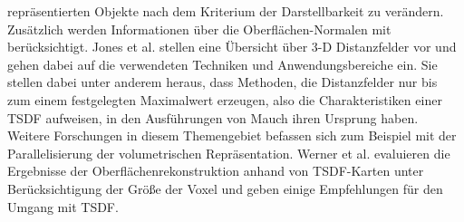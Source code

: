 repräsentierten Objekte nach dem Kriterium der Darstellbarkeit zu verändern. Zusätzlich werden Informationen über die Oberflächen-Normalen mit berücksichtigt.
Jones et al. \cite{jones2006distance} stellen eine Übersicht über 3-D Distanzfelder vor und gehen dabei auf die verwendeten Techniken und Anwendungsbereiche ein. Sie stellen dabei unter anderem heraus, dass Methoden, die Distanzfelder nur bis zum einem festgelegten Maximalwert erzeugen, also die Charakteristiken einer TSDF aufweisen, in den Ausführungen von Mauch \cite{mauch200fast, mauch2003efficient} ihren Ursprung haben. Weitere Forschungen in diesem Themengebiet befassen sich zum Beispiel mit der Parallelisierung der volumetrischen Repräsentation. Werner et al. \cite{werner2014truncated} evaluieren die Ergebnisse der Oberflächenrekonstruktion anhand von TSDF-Karten unter Berücksichtigung der Größe der Voxel und geben einige Empfehlungen für den Umgang mit TSDF.

